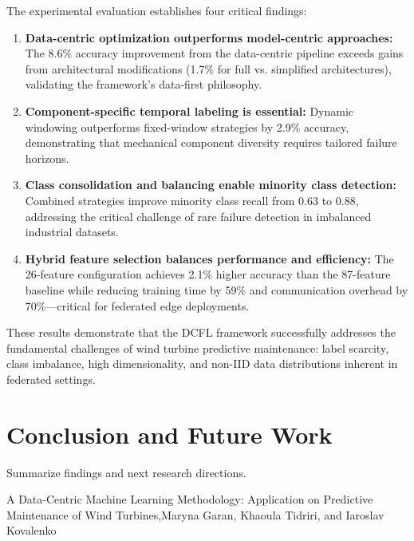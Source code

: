 \documentclass[12pt]{article}
\begin{document}
The experimental evaluation establishes four critical findings:

\begin{enumerate}
    \item \textbf{Data-centric optimization outperforms model-centric approaches:} The 8.6\% accuracy improvement from the data-centric pipeline exceeds gains from architectural modifications (1.7\% for full vs. simplified architectures), validating the framework's data-first philosophy.
    
    \item \textbf{Component-specific temporal labeling is essential:} Dynamic windowing outperforms fixed-window strategies by 2.9\% accuracy, demonstrating that mechanical component diversity requires tailored failure horizons.
    
    \item \textbf{Class consolidation and balancing enable minority class detection:} Combined strategies improve minority class recall from 0.63 to 0.88, addressing the critical challenge of rare failure detection in imbalanced industrial datasets.
    
    \item \textbf{Hybrid feature selection balances performance and efficiency:} The 26-feature configuration achieves 2.1\% higher accuracy than the 87-feature baseline while reducing training time by 59\% and communication overhead by 70\%—critical for federated edge deployments.
\end{enumerate}

These results demonstrate that the DCFL framework successfully addresses the fundamental challenges of wind turbine predictive maintenance: label scarcity, class imbalance, high dimensionality, and non-IID data distributions inherent in federated settings.


\section{Conclusion and Future Work}
Summarize findings and next research directions.



 A Data-Centric Machine Learning Methodology: Application on Predictive Maintenance of Wind Turbines,Maryna Garan, Khaoula Tidriri, and Iaroslav Kovalenko
\end{document}
